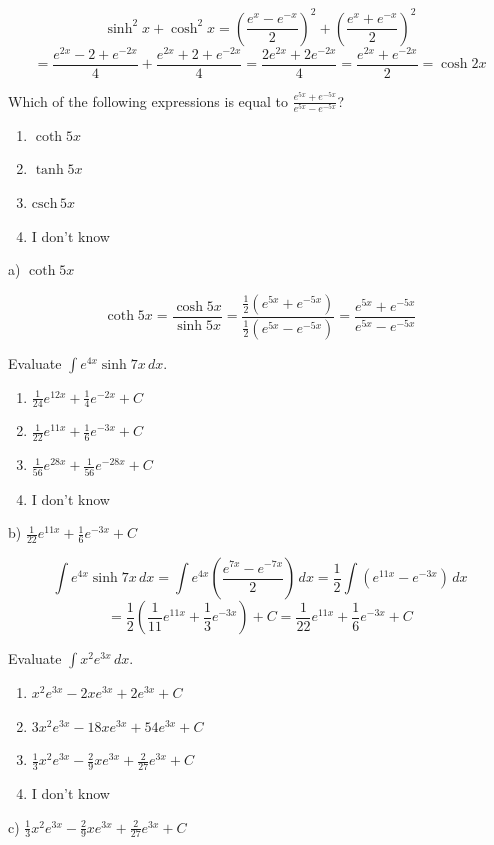 \documentclass[addpoints,12pt,answers]{exam}
\begin{document}
\begin{questions}
\begin{solution}
    $$\sinh^2 x+\cosh^2 x=\left(\frac{e^x-e^{-x}}{2}\right)^2+\left(\frac{e^x+e^{-x}}{2}\right)^2$$
    $$=\frac{e^{2x}-2+e^{-2x}}{4}+\frac{e^{2x}+2+e^{-2x}}{4}=\frac{2e^{2x}+2e^{-2x}}{4}=\frac{e^{2x}+e^{-2x}}{2}=\cosh 2x$$
  \end{solution}
  \newpage
  \question
  Which of the following expressions is equal to $\displaystyle\frac{e^{5x}+e^{-5x}}{e^{5x}-e^{-5x}}$?
  \begin{enumerate}[label=\alph*)]
    \item
    $\coth 5x$
    \item
    $\tanh 5x$
    \item
    $\mathrm{csch} \, 5x$
    \item
    I don't know
  \end{enumerate}
  \begin{solution}
    a) $\coth 5x$
    
    $$\coth 5x=\frac{\cosh 5x}{\sinh 5x}=\frac{\frac{1}{2}(e^{5x}+e^{-5x})}{\frac{1}{2}(e^{5x}-e^{-5x})}=\frac{e^{5x}+e^{-5x}}{e^{5x}-e^{-5x}}$$
  \end{solution}
  \newpage
  \question
  Evaluate $\displaystyle\int e^{4x}\sinh 7x\,dx$.
  \begin{enumerate}[label=\alph*)]
    \item
    $\displaystyle\frac{1}{24}e^{12x}+\frac{1}{4}e^{-2x}+C$
    \item
    $\displaystyle\frac{1}{22}e^{11x}+\frac{1}{6}e^{-3x}+C$
    \item
    $\displaystyle\frac{1}{56}e^{28x}+\frac{1}{56}e^{-28x}+C$
    \item
    I don't know
  \end{enumerate}
  \begin{solution}
    b) $\displaystyle\frac{1}{22}e^{11x}+\frac{1}{6}e^{-3x}+C$
    
    $$\int e^{4x}\sinh 7x\,dx=\int e^{4x}\left(\frac{e^{7x}-e^{-7x}}{2}\right)\,dx=\frac{1}{2}\int(e^{11x}-e^{-3x})\,dx$$
    $$=\frac{1}{2}\left(\frac{1}{11}e^{11x}+\frac{1}{3}e^{-3x}\right)+C=\frac{1}{22}e^{11x}+\frac{1}{6}e^{-3x}+C$$
  \end{solution}
  \newpage
{}
  \question
  Evaluate $\displaystyle\int x^2 e^{3x}\,dx$.
  \begin{enumerate}[label=\alph*)]
    \item
    $\displaystyle x^2 e^{3x}-2x e^{3x}+2e^{3x}+C$
    \item
    $\displaystyle 3x^2 e^{3x}-18x e^{3x}+54e^{3x}+C$
    \item
    $\displaystyle\frac{1}{3}x^2 e^{3x}-\frac{2}{9}x e^{3x}+\frac{2}{27}e^{3x}+C$
    \item
    I don't know
  \end{enumerate}
  \begin{solution}
    c) $\displaystyle\frac{1}{3}x^2 e^{3x}-\frac{2}{9}x e^{3x}+\frac{2}{27}e^{3x}+C$
    

\end{solution}
\end{questions}
\end{document}
